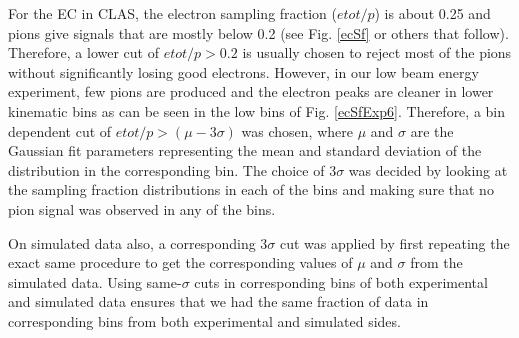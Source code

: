 For the EC in CLAS, the electron sampling fraction ($etot/p$) is about 0.25 and pions give signals that are mostly below 0.2 (see Fig. \ref{ecSf} or others that follow). Therefore, a lower cut of $etot/p > 0.2$ is usually chosen to reject most of the pions without significantly losing good electrons. However, in %
our low beam energy experiment, %
few pions are produced and the electron peaks are cleaner in lower kinematic bins as can be seen in the low \qsqs bins of Fig. \ref{ecSfExp6}. Therefore, %
a \qsqs bin dependent cut of $etot/p > (\mu - 3\sigma)$ was chosen, where $\mu$ and $\sigma$ are the Gaussian fit parameters representing the mean and standard deviation of the distribution in the corresponding \qsqs bin. 
The choice of $3 \sigma$ was decided by looking at the sampling fraction distributions in each of the \qsqs bins and making sure that no pion signal was observed in any of the bins.


On simulated data also, a corresponding $3 \sigma$ cut was applied by first repeating the exact same procedure to get the corresponding values of $\mu$ and $\sigma$ from the simulated data. Using same-$\sigma$ cuts %
in corresponding \qsqs bins of both experimental and simulated data ensures that we had the same fraction of data in corresponding bins from both experimental and simulated sides. 



